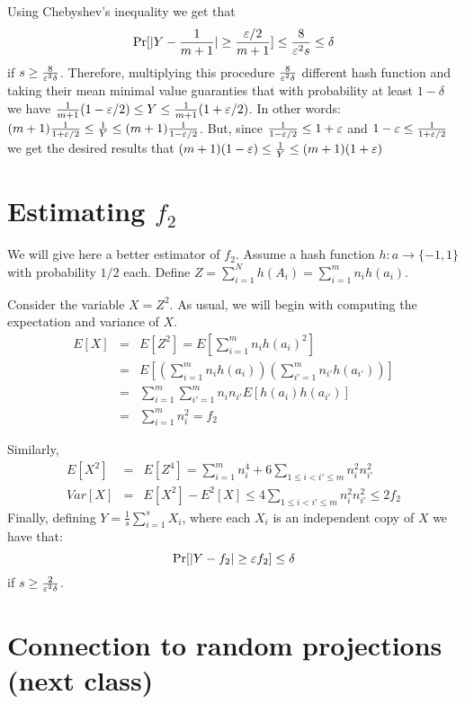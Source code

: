 \documentclass{article}
\begin{document}
Using Chebyshev's inequality we get that 
\[
\Pr[|Y - \frac{1}{m+1}| \ge \frac{\varepsilon/2}{m+1}] \le \frac{8}{\varepsilon^2 s} \le \delta
\] 
if $s \ge \frac{8}{\varepsilon^2 \delta}$. Therefore, multiplying this procedure $\frac{8}{\varepsilon^2 \delta}$ different 
hash function and taking their mean minimal value guaranties that with probability at least $1-\delta$ we have
$\frac{1}{m+1}(1-\varepsilon/2) \le Y \le \frac{1}{m+1}(1+\varepsilon/2)$.
In other words: $(m+1)\frac{1}{1+\varepsilon/2} \le \frac{1}{Y} \le (m+1)\frac{1}{1-\varepsilon/2}$.
But, since $\frac{1}{1-\varepsilon/2} \le 1+ \varepsilon$ and $1- \varepsilon \le \frac{1}{1+\varepsilon/2}$ we get the desired results
that $(m+1)(1-\varepsilon) \le \frac{1}{Y} \le (m+1)(1+\varepsilon)$



\section*{Estimating $f_2$}

We will give here a better estimator of $f_2$.
Assume a hash function $h:a\rightarrow \{-1,1\}$ with probability $1/2$ each.
Define $Z = \sum_{i=1}^{N}h(A_i) = \sum_{i=1}^{m}n_i h(a_i)$.

Consider the variable $X = Z^2$. As usual, we will begin with computing the expectation and variance of $X$.
\begin{eqnarray*}
E[X] &=& E[Z^2] = E[\sum_{i=1}^{m}n_i h(a_i)^2]\\
&=& E[(\sum_{i=1}^{m}n_i h(a_i))(\sum_{i'=1}^{m}n_{i'} h(a_{i'}))]\\
&=& \sum_{i=1}^{m}\sum_{i'=1}^{m}n_i n_{i'} E[h(a_{i}) h(a_{i'})]\\
&=& \sum_{i=1}^{m} n_{i}^{2} = f_2
\end{eqnarray*}
 
Similarly,
\begin{eqnarray*}
E[X^2] &=& E[Z^4] = \sum_{i=1}^{m} n_{i}^{4} + 6\sum_{1\le i < i' \le m} n_{i}^{2}n_{i'}^{2}\\
Var[X] &=& E[X^2] - E^2[X] \le 4\sum_{1\le i < i' \le m} n_{i}^{2}n_{i'}^{2} \le 2f_2
\end{eqnarray*}
Finally, defining $Y = \frac{1}{s}\sum_{i=1}^{s}X_i$, where each $X_i$ is an independent copy of $X$ we have that:
\[
\Pr[|Y -f_2| \ge \varepsilon f_2] \le \delta
\]
if $s \ge \frac{2}{\varepsilon^2 \delta}$.

\section*{Connection to random projections (next class)}
  
\end{document}
